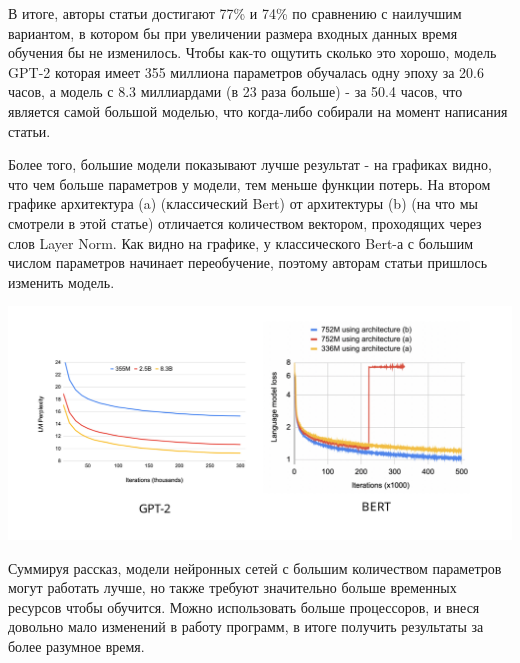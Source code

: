 В итоге, авторы статьи достигают 77\% и 74\% по сравнению с наилучшим вариантом, в котором бы при увеличении размера входных данных время обучения бы не изменилось. Чтобы как-то ощутить сколько это хорошо, модель GPT-2 которая имеет 355 миллиона параметров обучалась одну эпоху за 20.6 часов, а модель с 8.3 миллиардами (в 23 раза больше) - за 50.4 часов, что является самой большой моделью, что когда-либо собирали на момент написания статьи.

Более того, большие модели показывают лучше результат - на графиках видно, что чем больше параметров у модели, тем меньше функции потерь. На втором графике архитектура (a) (классический Bert) от архитектуры (b) (на что мы смотрели в этой статье) отличается количеством вектором, проходящих через слов Layer Norm. Как видно на графике, у классического Bert-а с большим числом параметров начинает переобучение, поэтому авторам статьи пришлось изменить модель.  

\includegraphics[width=0.8\linewidth]{Parts/images/TP_loss.png}

Суммируя рассказ, модели нейронных сетей с большим количеством параметров могут работать лучше, но также требуют значительно больше временных ресурсов чтобы обучится. Можно использовать больше процессоров, и внеся довольно мало изменений в работу программ, в итоге получить результаты за более разумное время.
